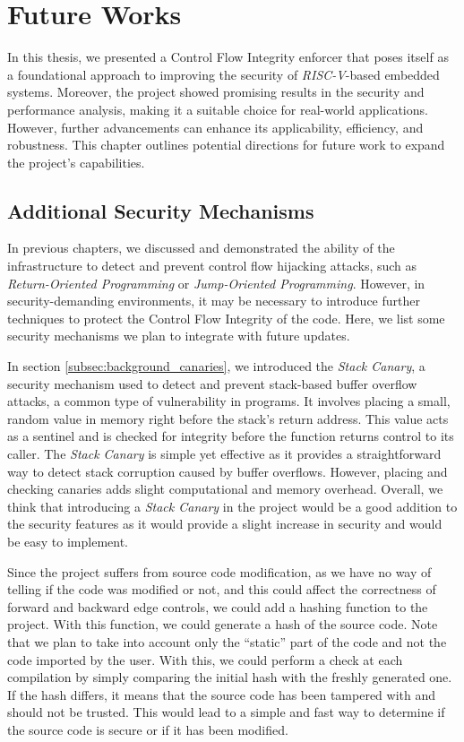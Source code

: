 \chapter{Future Works}
\label{cha:future}

In this thesis, we presented a Control Flow Integrity enforcer that poses itself
as a foundational approach to improving the security of \textit{RISC-V}-based
embedded systems. Moreover, the project showed promising results in the security
and performance analysis, making it a suitable choice for real-world applications.
However, further advancements can enhance its applicability, efficiency, and robustness.
This chapter outlines potential directions for future work to expand the project's
capabilities.

\section{Additional Security Mechanisms}
\label{sec:future_security}

In previous chapters, we discussed and demonstrated the ability of the
infrastructure to detect and prevent control flow hijacking attacks, such as \textit{Return-Oriented
Programming} or \textit{Jump-Oriented Programming}. However, in security-demanding
environments, it may be necessary to introduce further techniques to protect the
Control Flow Integrity of the code. Here, we list some security mechanisms we
plan to integrate with future updates.

In section \ref{subsec:background_canaries}, we introduced the \textit{Stack
Canary}, a security mechanism used to detect and prevent stack-based buffer overflow
attacks, a common type of vulnerability in programs. It involves placing a small,
random value in memory right before the stack's return address. This value acts as
a sentinel and is checked for integrity before the function returns control to its
caller. The \textit{Stack Canary} is simple yet effective as it provides a straightforward
way to detect stack corruption caused by buffer overflows. However, placing and checking
canaries adds slight computational and memory overhead. Overall, we think that introducing
a \textit{Stack Canary} in the project would be a good addition to the security
features as it would provide a slight increase in security and would be easy to
implement.

Since the project suffers from source code modification, as we have no way of telling
if the code was modified or not, and this could affect the correctness of
forward and backward edge controls, we could add a hashing function to the project.
With this function, we could generate a hash of the source code. Note that we
plan to take into account only the ``static'' part of the code and not the code
imported by the user. With this, we could perform a check at each compilation by
simply comparing the initial hash with the freshly generated one. If the hash differs,
it means that the source code has been tampered with and should not be trusted. This
would lead to a simple and fast way to determine if the source code is secure or
if it has been modified.

